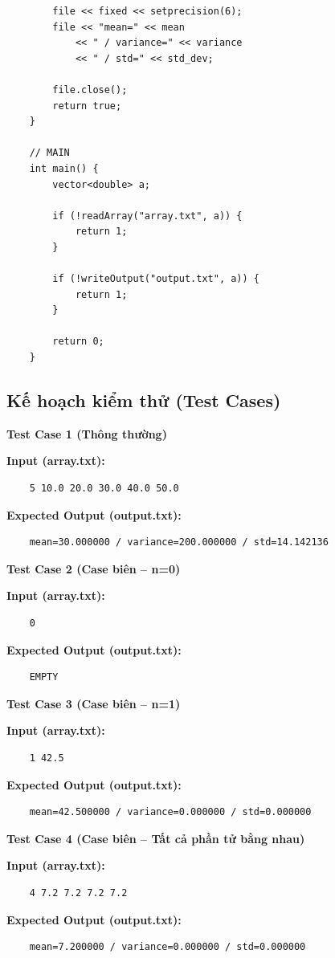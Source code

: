 \begin{lstlisting}
        file << fixed << setprecision(6);
        file << "mean=" << mean 
            << " / variance=" << variance 
            << " / std=" << std_dev;

        file.close();
        return true;
    }

    // MAIN
    int main() {
        vector<double> a;

        if (!readArray("array.txt", a)) {
            return 1;
        }

        if (!writeOutput("output.txt", a)) {
            return 1;
        }

        return 0;
    }
    \end{lstlisting}

\subsection{Kế hoạch kiểm thử (Test Cases)}

    \textbf{Test Case 1 (Thông thường)}
    
    \textbf{Input (array.txt):}
    \begin{lstlisting}
    5 10.0 20.0 30.0 40.0 50.0\end{lstlisting}
    \textbf{Expected Output (output.txt):}
    \begin{lstlisting}
    mean=30.000000 / variance=200.000000 / std=14.142136\end{lstlisting}

    \vspace{0.5cm}

    \textbf{Test Case 2 (Case biên -- n=0)}
    
    \textbf{Input (array.txt):}
    \begin{lstlisting}
    0\end{lstlisting}
    \textbf{Expected Output (output.txt):}
    \begin{lstlisting}
    EMPTY\end{lstlisting}

    \vspace{0.5cm}
    
    \textbf{Test Case 3 (Case biên -- n=1)}

    \textbf{Input (array.txt):}
    \begin{lstlisting}
    1 42.5\end{lstlisting}
    \textbf{Expected Output (output.txt):}
    \begin{lstlisting}
    mean=42.500000 / variance=0.000000 / std=0.000000\end{lstlisting}

    \vspace{0.5cm}
    
    \textbf{Test Case 4 (Case biên -- Tất cả phần tử bằng nhau)}

    \textbf{Input (array.txt):}
    \begin{lstlisting}
    4 7.2 7.2 7.2 7.2\end{lstlisting}
    \textbf{Expected Output (output.txt):}
    \begin{lstlisting}
    mean=7.200000 / variance=0.000000 / std=0.000000\end{lstlisting}